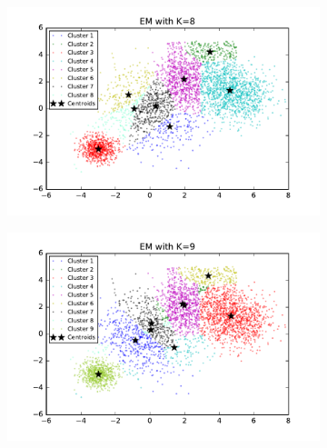 \begin{figure}[htb]
\begin{subfigure}[b]{0.475\textwidth}
        \end{subfigure}
        \hfill
        \begin{subfigure}[b]{0.475\textwidth}  
            \centering 
            \includegraphics[width=\textwidth]{./figures/bigClustering_EM_8.pdf}
        \end{subfigure}
        \begin{subfigure}[b]{0.475\textwidth}   
            \centering 
            \includegraphics[width=\textwidth]{./figures/bigClustering_EM_9.pdf}
        \end{subfigure}
        \hfill
        \begin{subfigure}[b]{0.475\textwidth}   
            \centering 

\end{subfigure}
\end{figure}
